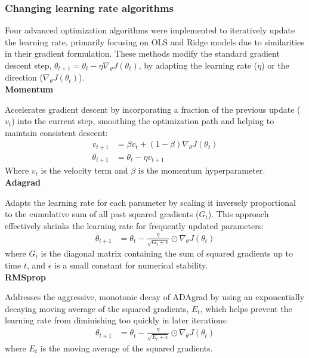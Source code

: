 \documentclass[twocolumn,aps]{revtex4}
\begin{document}
\subsubsection{Changing learning rate algorithms}
Four advanced optimization algorithms were implemented to iteratively update the learning rate, primarily focusing on OLS and Ridge models due to similarities in their gradient formulation.
These methods modify the standard gradient descent step, $\theta_{t+1}=\theta_t-\eta\nabla_{\theta} J(\theta_t)$, by adapting the learning rate ($\eta$) or the direction ($\nabla_{\theta} J(\theta_t)$).
\\ 

\textbf{Momentum}

Accelerates gradient descent by incorporating a fraction of the previous update ($v_t$) into the current step, smoothing the optimization path and helping to maintain consistent descent:
\begin{align*}
v_{t+1} &= \beta v_t + (1 - \beta) \nabla_{\theta} J(\theta_t) \\
\theta_{t+1} &= \theta_t - \eta v_{t+1}
\end{align*}
Where $v_t$ is the velocity term and $\beta$ is the momentum hyperparameter.
\\

\textbf{Adagrad}

Adapts the learning rate for each parameter by scaling it inversely proportional to the cumulative sum of all past squared gradients ($G_t$). This approach effectively shrinks the learning rate for frequently updated parameters:
\begin{align*}
\theta_{t+1} &= \theta_t - \frac{\eta}{\sqrt{G_t + \epsilon}} \odot \nabla_{\theta} J(\theta_t)
\end{align*}
where $G_t$ is the diagonal matrix containing the sum of squared gradients up to time $t$, and $\epsilon$ is a small constant for numerical stability.
\\

\textbf{RMSprop}

Addresses the aggressive, monotonic decay of ADAgrad by using an exponentially decaying moving average of the squared gradients, $E_t$, which helps prevent the learning rate from diminishing too quickly in later iterations:
\begin{align*}
\theta_{t+1} &= \theta_t - \frac{\eta}{\sqrt{E_t + \epsilon}} \odot \nabla_{\theta} J(\theta_t)
\end{align*}
where $E_t$ is the moving average of the squared gradients.
\\
\end{document}
